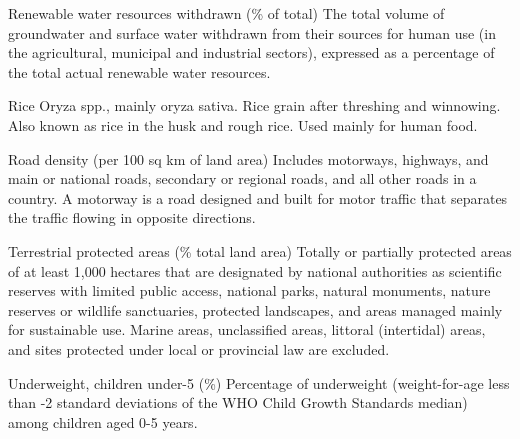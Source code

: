 \begin{MetadataCollection} {}
\begin{Energy consumption in agriculture, total} {}
\begin{metadata}{Renewable water resources withdrawn (\% of total)} {}
The total volume of groundwater and surface water withdrawn from their sources for human use (in the agricultural, municipal and industrial sectors), expressed as a percentage of the total actual renewable water resources.
\end{metadata}

\begin{metadata}{Rice} {}
Oryza spp., mainly oryza sativa.  Rice grain after threshing and winnowing. Also known as rice in the husk and rough rice. Used mainly for human food.
\end{metadata}

\begin{metadata}{Road density (per 100 sq km of land area)} {}
Includes motorways, highways, and main or national roads, secondary or regional roads, and all other roads in a country. A motorway is a road designed and built for motor traffic that separates the traffic flowing in opposite directions.
\end{metadata}

\begin{metadata}{Terrestrial protected areas (\% total land area)} {}
Totally or partially protected areas of at least 1,000 hectares that are designated by national authorities as scientific reserves with limited public access, national parks, natural monuments, nature reserves or wildlife sanctuaries, protected landscapes, and areas managed mainly for sustainable use. Marine areas, unclassified areas, littoral (intertidal) areas, and sites protected under local or provincial law are excluded.
\end{metadata}

\begin{metadata}{Underweight, children under-5 (\%)} {}
Percentage of underweight (weight-for-age less than -2 standard deviations of the WHO Child Growth Standards median) among children aged 0-5 years.
\end{metadata}


\end{Energy consumption in agriculture, total}
\end{MetadataCollection}
